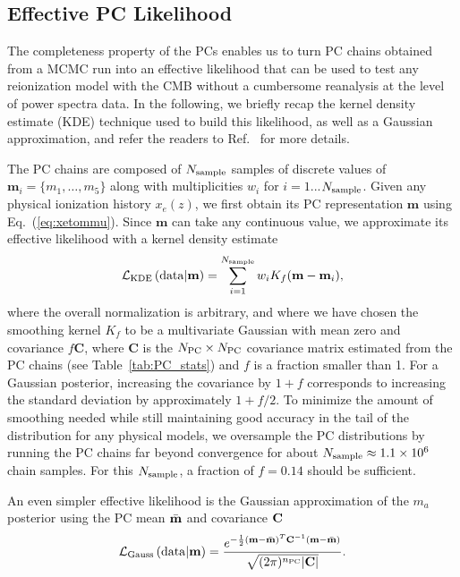 \documentclass[prd,twocolumn,amsmath,amssymb,floatfix,superscriptaddress,nofootinbib]{revtex4-1}
\newcommand{\sample}{{\rm sample}}
\newcommand{\beq}{\begin{equation}}
\newcommand{\eeq}{\end{equation}}
\begin{document}
%
%
%
%

\subsection{Effective PC Likelihood}
\label{sec:KDE}
The completeness property of the PCs enables us to turn PC chains obtained from a MCMC run into an effective likelihood that can be used to test any reionization model with the CMB without a cumbersome reanalysis at the level of power spectra data. In the following, we briefly recap the kernel density estimate (KDE) technique used to build this likelihood, as well as a Gaussian approximation, and refer the readers to Ref.~\cite{Heinrich:2016ojb} for more details.

The PC chains are composed of $N_{\rm sample}$ samples of discrete values of $\mathbf{m}_i = \{m_1, \ldots, m_5\}$ along with multiplicities $w_i$ for $i = 1$...$N_{\rm sample}$. Given any physical ionization history $x_e(z)$, we first obtain its PC representation $\mathbf{m}$ using Eq.~(\ref{eq:xetommu}). Since $\mathbf{m}$ can take any continuous value, we approximate its effective likelihood with a kernel density estimate
\beq
{\cal L}_{\rm KDE}\left({\rm data}|\mathbf{m} \right)  = \sum_{i = 1}^{N_{\rm sample}} w_i K_f(\mathbf{m}-\mathbf{m}_i),
\eeq
where the overall normalization is arbitrary, and where we have chosen the smoothing kernel $K_f$ to be a  multivariate Gaussian with mean zero and covariance $f\mathbf{C}$, where $\mathbf{C}$ is the $N_{\rm PC} \times N_{\rm PC}$ covariance matrix estimated from the PC chains (see Table~\ref{tab:PC_stats}) and $f$ is a fraction smaller than 1.
For a Gaussian posterior, increasing the covariance by $1+f$ corresponds to increasing the standard deviation by approximately $1+f/2$. To minimize the amount of smoothing needed while still maintaining good accuracy in the tail of the distribution for any physical models, we oversample the PC distributions by running the PC chains far beyond convergence for about $N_{\sample} \approx 1.1 \times 10^{6}$ chain samples. 
For this $N_{\sample}$, a fraction of $f = 0.14$ should be sufficient.

An even simpler effective likelihood is the Gaussian approximation of the $m_a$ posterior using the PC mean $\bar{\bf m}$ and covariance $\bf C$
%
\begin{equation}
 {\cal L}_{\rm Gauss}\left({\rm data}|\mathbf{m} \right) = \frac{ e^{-\frac{1}{2} ({\bf m}-\bar{\bf m})^T {\bf C}^{-1} ({\bf m}-\bar{\bf m}) } }{\sqrt{(2\pi)^{n_{\rm PC}} | \mathbf{C}| }}.
 \label{eq:gaussian}
 \end{equation}
%
\end{document}
